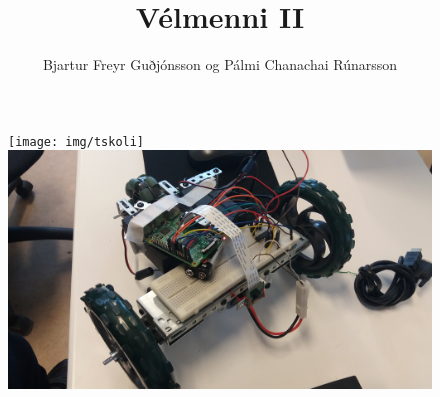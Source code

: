 \documentclass{article}
\begin{document}
\title{Vélmenni II}
\author{Bjartur Freyr Guðjónsson og Pálmi Chanachai Rúnarsson}
\maketitle
\begin{figure}[h]
\centering
\texttt{[image: img/tskoli]}
\includegraphics[scale=1]{img/dangerdrone (1).jpg}
\end{figure}
\newpage
\tableofcontents
\newpage

\newpage

\newpage

\newpage

\newpage

\newpage

\newpage



\newpage

\end{document}
